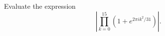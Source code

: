 Evaluate the expression \[\left|\displaystyle\prod_{k=0}^{15}\left(1+e^{2\pi ik^2/31}\right)\right|.\]